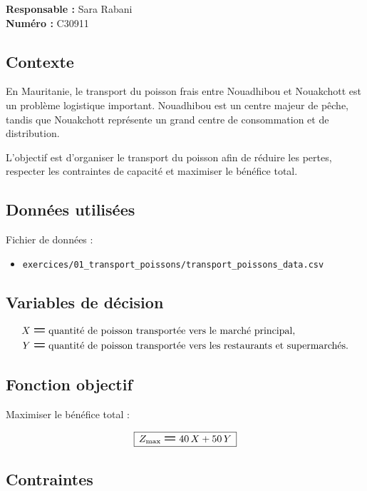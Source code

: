 \documentclass[12pt,a4paper]{article}
\newcommand{\Eq}{\mathrel{\text{\Large\bfseries =}}}
\newcommand{\BoxedEq}[1]{%
  \begin{equation*}
    \boxed{\,\displaystyle #1\,}
  \end{equation*}%
}
\begin{document}
\begin{responsable}
\textbf{Responsable :} Sara Rabani \\
\textbf{Numéro :} C30911
\end{responsable}

\subsection{Contexte}

En Mauritanie, le transport du poisson frais entre Nouadhibou et Nouakchott est un problème logistique important. Nouadhibou est un centre majeur de pêche, tandis que Nouakchott représente un grand centre de consommation et de distribution.

L'objectif est d'organiser le transport du poisson afin de réduire les pertes, respecter les contraintes de capacité et maximiser le bénéfice total.

\subsection{Données utilisées}
Fichier de données :
\begin{itemize}
    \item \texttt{exercices/01\_transport\_poissons/transport\_poissons\_data.csv}
\end{itemize}

\subsection{Variables de décision}

\[
\begin{aligned}
X &\Eq \text{quantité de poisson transportée vers le marché principal}, \\
Y &\Eq \text{quantité de poisson transportée vers les restaurants et supermarchés}.
\end{aligned}
\]

\subsection{Fonction objectif}

Maximiser le bénéfice total :

\BoxedEq{Z_{\mathrm{max}} \Eq 40\,X + 50\,Y}

\subsection{Contraintes}
\end{document}
